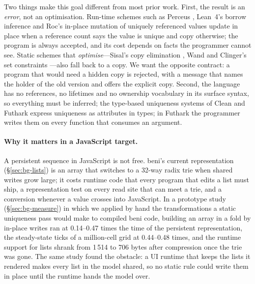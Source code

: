 Two things make this goal different from most prior work. First, the result is an \emph{error},
not an optimisation. Run-time schemes such as Perceus \citep{reinking2021perceus}, Lean~4's
borrow inference \citep{ullrich2019beans} and Roc's in-place mutation of uniquely referenced
values \citep{teeuwissen2023roc}
update in place when a reference count says the value is unique and copy otherwise; the program is
always accepted, and its cost depends on facts the programmer cannot see. Static schemes that
\emph{optimise}---Sisal's copy elimination \citep{cann1990sisal}, Wand and Clinger's set
constraints \citep{wand2001set}---also fall back to a copy. We want the opposite contract: a
program that would need a hidden copy is rejected, with a message that names the holder of the old
version and offers the explicit copy. Second, the language has no references, no lifetimes and no
ownership vocabulary in its surface syntax, so everything must be inferred; the type-based
uniqueness systems of Clean \citep{barendsen1996uniqueness,plasmeijer2011clean} and Futhark
\citep{henriksen2017futhark} express uniqueness as attributes in types; in Futhark the programmer writes
them on every function that consumes an argument.

\paragraph{Why it matters in a JavaScript target.}
A persistent sequence in JavaScript is not free. beni's current representation (\S\ref{sec:bg-lists})
is an array that switches to a 32-way radix trie when shared writes grow large; it costs runtime
code that every program that edits a list must ship, a representation test on every read site that
can meet a trie, and a conversion whenever a value crosses into JavaScript. In a prototype study
(\S\ref{sec:bg-measure}) in which we applied by hand the transformations a static uniqueness pass
would make to compiled beni code, building an array in a fold by in-place writes ran at 0.14--0.47
times the time of the persistent representation, the steady-state ticks of a million-cell grid at
0.44--0.48 times, and the runtime support for lists shrank from 1\,514 to 706 bytes after compression
once the trie was gone. The same study found the obstacle: a UI runtime that keeps the lists it
rendered makes every list in the model shared, so no static rule could write them in place until
the runtime hands the model over.

